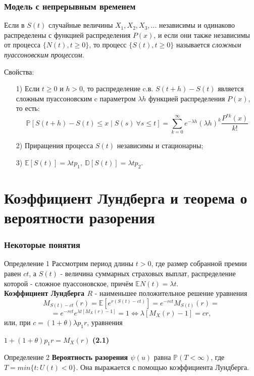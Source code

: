 \documentclass[10pt]{beamer}
\begin{document}
\begin{frame}
\frametitle{Модель с непрерывным временем}
\noindent
Если в $S(t)$ случайные величины $X_{1}, X_{2}, X_{3}, ...$ независимы и одинаково распределены с функцией распределения $P(x)$, и если они также независимы от процесса $\big\{N(t), t\geq 0\big\}$, то процесс $\big\{S(t), t\geq 0\big\}$ называется \textit{сложным пуассоновским процессом}.
\begin{block} {Свойства:}
\begin{enumerate}
    \item[1)] Если $t\geq 0 $ и $h > 0$, то распределение c.в. $S(t + h) - S(t)$ является сложным пуассоновским c параметром $\lambda h$ функцией распределения $P(x)$, то есть:
    \begin{equation*}
        \mathbb{P}[S(t+h)-S(t)\leq x \mid S(s)\ \forall s \leq t] = 
        \sum_{k=0}^{ \infty }e^{- \lambda h}(\lambda h)^{k} \frac{P^{\ast k}(x) }{k!}
    \end{equation*}
    \item[2)] Приращения процесса $S(t)$ независимы и стационарны;
    \item[3)] $\mathbb{E}[S(t)] = \lambda t p_1,\ \mathbb{D}[S(t)] = \lambda t p_2$.
\end{enumerate}
\end{block}
\end{frame}


\section{Коэффициент Лундберга и теорема о вероятности разорения}
\begin{frame}
\frametitle{Некоторые понятия}
\begin{block}{Определение 1}
Рассмотрим период длины $t > 0$, где размер собранной  премии равен $ct$, а $S(t)$ - величина суммарных страховых выплат, распределение которой - сложное пуассоновское, причём $\mathbb{E}N(t) = {\lambda}t$.
\\ \textbf{Коэффициент Лундберга ${R}$} - наименьшее положительное решение уравнения $$M_{S(t)-ct}(r) = \mathbb{E}[e^{r(S(t)-ct)}] = e^{-rct}M_{S(t)}(r) = $$ $$= e^{-rct}e^{{\lambda}t[M_{X}(r)-1]} = 1 \Leftrightarrow {\lambda}[M_{X}(r)-1] = cr,$$или, при $c = (1+{\theta}){\lambda}p_{1}r$, уравнения 
\begin{center}$1+(1+\theta)p_{1}r = M_{X}(r)$ \textbf{(2.1)} \end{center}
\end{block}
\begin{block}{Определение 2}
\textbf{Вероятность разорения $\psi(u)$} равна $\mathbb{P}(T < \infty)$, где $T = min\{t: U(t) < 0\}$. Она выражается с помощью коэффициента Лундберга.
\end{block}
\end{frame}
\end{document}
